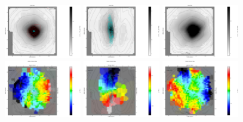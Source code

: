 \begin{figure}
      \centering
      \includegraphics[width=0.3\textwidth]{chapter4/Vmaps/ic4296_stellar_img.png}
      \includegraphics[width=0.3\textwidth]{chapter4/Vmaps/ngc0612_stellar_img.png}
      \includegraphics[width=0.3\textwidth]{chapter4/Vmaps/ngc1399_stellar_img.png}
      \\
      \includegraphics[width=0.3\textwidth]{chapter4/Vmaps/ic4296_stellar_vel.png}
      \includegraphics[width=0.3\textwidth]{chapter4/Vmaps/ngc0612_stellar_vel.png}
      \includegraphics[width=0.3\textwidth]{chapter4/Vmaps/ngc1399_stellar_vel.png}
      \\

\end{figure}
